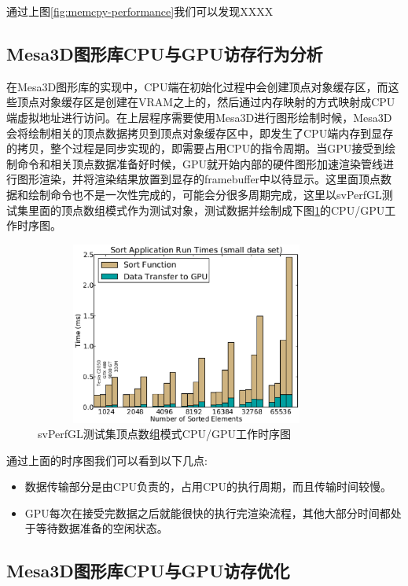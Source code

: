 通过上图\ref{fig:memcpy-performance}我们可以发现XXXX

\subsection{Mesa3D图形库CPU与GPU访存行为分析}

在Mesa3D图形库的实现中，CPU端在初始化过程中会创建顶点对象缓存区，而这些顶点对象缓存区是创建在VRAM之上的，然后通过内存映射的方式映射成CPU端虚拟地址进行访问。在上层程序需要使用Mesa3D进行图形绘制时候，Mesa3D会将绘制相关的顶点数据拷贝到顶点对象缓存区中，即发生了CPU端内存到显存的拷贝，整个过程是同步实现的，即需要占用CPU的指令周期。当GPU接受到绘制命令和相关顶点数据准备好时候，GPU就开始内部的硬件图形加速渲染管线进行图形渲染，并将渲染结果放置到显存的framebuffer中以待显示。这里面顶点数据和绘制命令也不是一次性完成的，可能会分很多周期完成，这里以svPerfGL测试集里面的顶点数组模式作为测试对象，测试数据并绘制成下图\ref{fig:mesa3d-data-transfer}的CPU/GPU工作时序图。

\begin{figure}[H] 
  \centering
  \includegraphics[width=10cm,height=6cm]{figures/chap03/mesa3d-data-transfer}
  \caption{svPerfGL测试集顶点数组模式CPU/GPU工作时序图}
  \label{fig:mesa3d-data-transfer}
\end{figure}

通过上面的时序图我们可以看到以下几点:

\begin{itemize}
\item{}数据传输部分是由CPU负责的，占用CPU的执行周期，而且传输时间较慢。
\item{}GPU每次在接受完数据之后就能很快的执行完渲染流程，其他大部分时间都处于等待数据准备的空闲状态。
\end{itemize}

\subsection{Mesa3D图形库CPU与GPU访存优化}

